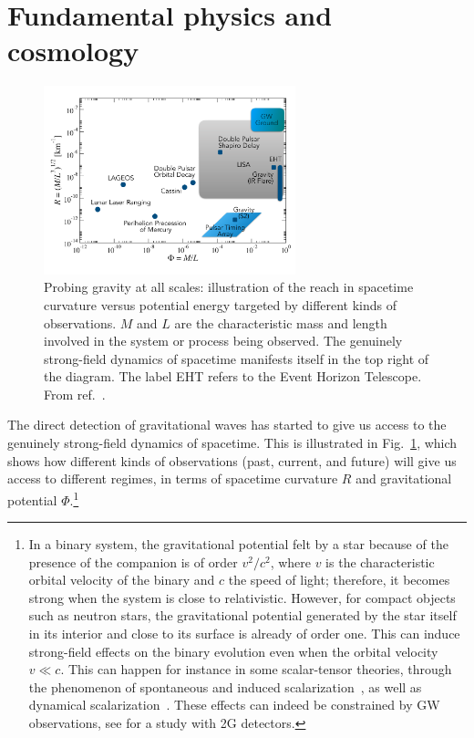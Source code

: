 \section{Fundamental physics and cosmology}

\begin{figure}[t]
\centering
\includegraphics[width=0.65\textwidth]{Figures/ToG2.pdf}
\caption{Probing gravity at all scales: illustration of the reach in spacetime curvature versus potential
energy targeted by different  kinds of observations. 
$M$ and $L$ are the characteristic mass and length involved in the system or process being observed. 
The genuinely strong-field dynamics of spacetime 
manifests itself in the top right of the diagram. The label EHT refers to the Event Horizon Telescope.
From ref.~\cite{3GScienceBook,Sathyaprakash:2019yqt}.
}
\label{fig:phasediagram}
\end{figure}


The direct detection of gravitational waves has started to give us access to the genuinely
strong-field dynamics of spacetime. This is illustrated in Fig.~\ref{fig:phasediagram}, which shows how 
different kinds of observations (past, current, and future) will give us access to different
regimes, in terms of spacetime curvature $R$ and gravitational potential $\Phi$.\footnote{In a binary system, the gravitational potential felt by a star because of the presence of the companion is of order $v^2/c^2$,
where $v$ is the characteristic orbital velocity of the binary and $c$ the speed of light; therefore, it becomes strong when the system is close to relativistic. However, for compact objects such as neutron stars,  the gravitational potential generated by the star itself in its interior and close to its surface is already of order one. This can induce  strong-field effects on the binary evolution even when the orbital velocity $v\ll c$. This  can happen for instance in some scalar-tensor theories, through the phenomenon of spontaneous and induced scalarization~\cite{Damour:1992we,Damour:1993hw}, as well as 
dynamical scalarization~\cite{Barausse:2012da}. These effects can indeed be constrained by GW observations, see \cite{Sampson:2014qqa} for a study with 2G detectors.}

